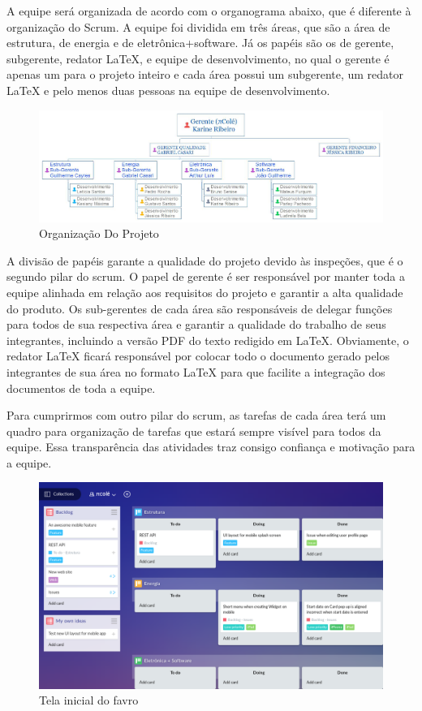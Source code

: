 A equipe será organizada de acordo com o organograma abaixo, que é diferente à organização do Scrum. A equipe foi dividida em três áreas, que são a área de estrutura, de energia e de eletrônica+software. Já os papéis são os de gerente, subgerente, redator LaTeX, e equipe de desenvolvimento, no qual o gerente é apenas um para o projeto inteiro e cada área possui um subgerente, um redator LaTeX e pelo menos duas pessoas na equipe de desenvolvimento.

\begin{figure}[H]
	\centering
    \includegraphics[scale=0.3]{figuras/organograma}
    \caption{Organização Do Projeto}
    \label{fig:organograma}
\end{figure}

A divisão de papéis garante a qualidade do projeto devido às inspeções, que é o segundo pilar do scrum. O papel de gerente é ser responsável por manter toda a equipe alinhada em relação aos requisitos do projeto e garantir a alta qualidade do produto. Os sub-gerentes de cada área são responsáveis de delegar funções para todos de sua respectiva área e garantir a qualidade do trabalho de seus integrantes, incluindo a versão PDF do texto redigido em LaTeX. Obviamente, o redator LaTeX ficará responsável por colocar todo o documento gerado pelos integrantes de sua área no formato LaTeX para que facilite a integração dos documentos de toda a equipe.

Para cumprirmos com outro pilar do scrum, as tarefas de cada área terá um quadro para organização de tarefas que estará sempre visível para todos da equipe. Essa transparência das atividades traz consigo confiança e motivação para a equipe.

\begin{figure}[H]
	\centering
    \includegraphics[scale=0.5]{figuras/favro}
    \caption{Tela inicial do favro}
    \label{fig:favro}
\end{figure}

